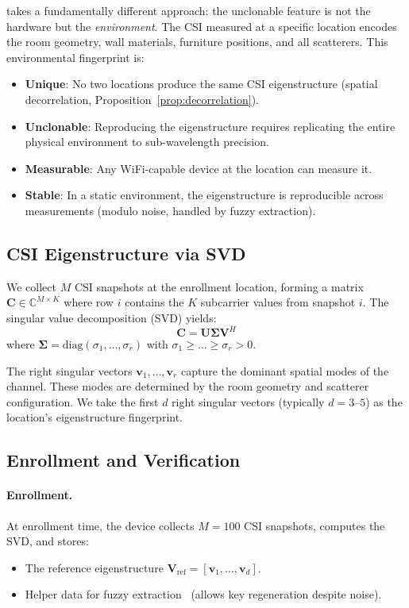 \puek takes a fundamentally different approach: the unclonable feature is not the hardware but the \emph{environment}.
The CSI measured at a specific location encodes the room geometry, wall materials, furniture positions, and all scatterers.
This environmental fingerprint is:
\begin{itemize}
\item \textbf{Unique}: No two locations produce the same CSI eigenstructure (spatial decorrelation, Proposition~\ref{prop:decorrelation}).
\item \textbf{Unclonable}: Reproducing the eigenstructure requires replicating the entire physical environment to sub-wavelength precision.
\item \textbf{Measurable}: Any WiFi-capable device at the location can measure it.
\item \textbf{Stable}: In a static environment, the eigenstructure is reproducible across measurements (modulo noise, handled by fuzzy extraction).
\end{itemize}

\subsection{CSI Eigenstructure via SVD}
\label{subsec:svd}

We collect $M$ CSI snapshots at the enrollment location, forming a matrix $\mathbf{C} \in \mathbb{C}^{M \times K}$ where row $i$ contains the $K$ subcarrier values from snapshot $i$.
The singular value decomposition (SVD) yields:
\begin{equation}
\mathbf{C} = \mathbf{U} \boldsymbol{\Sigma} \mathbf{V}^H
\label{eq:svd}
\end{equation}
where $\boldsymbol{\Sigma} = \text{diag}(\sigma_1, \ldots, \sigma_r)$ with $\sigma_1 \geq \ldots \geq \sigma_r > 0$.

The right singular vectors $\mathbf{v}_1, \ldots, \mathbf{v}_r$ capture the dominant spatial modes of the channel.
These modes are determined by the room geometry and scatterer configuration.
We take the first $d$ right singular vectors (typically $d = 3\text{--}5$) as the location's eigenstructure fingerprint.

\subsection{Enrollment and Verification}
\label{subsec:enrollment}

\paragraph{Enrollment.}
At enrollment time, the device collects $M = 100$ CSI snapshots, computes the SVD, and stores:
\begin{itemize}
\item The reference eigenstructure $\mathbf{V}_{\text{ref}} = [\mathbf{v}_1, \ldots, \mathbf{v}_d]$.
\item Helper data for fuzzy extraction~\cite{dodis2008fuzzy} (allows key regeneration despite noise).
\end{itemize}

